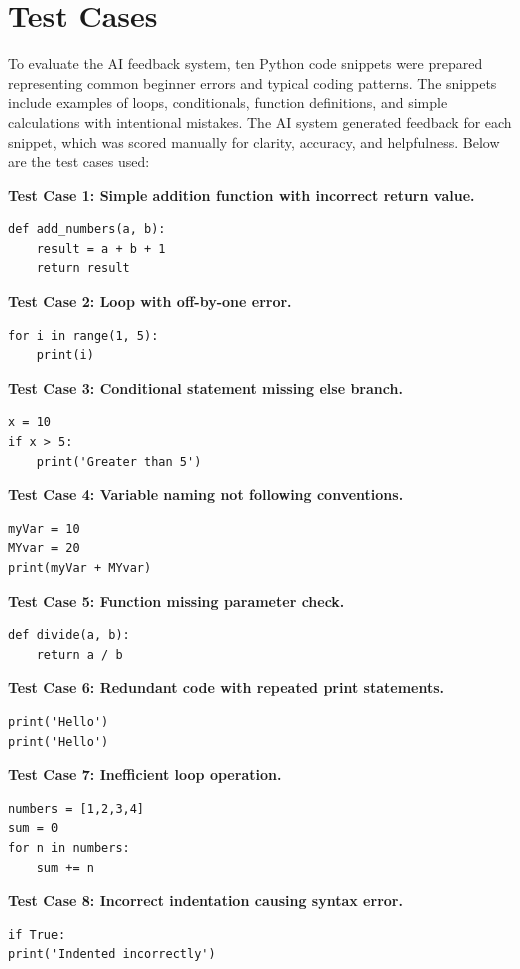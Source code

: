 \documentclass[12pt]{article}
\begin{document}
\section*{Test Cases}

To evaluate the AI feedback system, ten Python code snippets were prepared representing common beginner errors and typical coding patterns. The snippets include examples of loops, conditionals, function definitions, and simple calculations with intentional mistakes. The AI system generated feedback for each snippet, which was scored manually for clarity, accuracy, and helpfulness. Below are the test cases used:

\textbf{Test Case 1: Simple addition function with incorrect return value.}
\begin{lstlisting}
def add_numbers(a, b):
    result = a + b + 1
    return result
\end{lstlisting}

\textbf{Test Case 2: Loop with off-by-one error.}
\begin{lstlisting}
for i in range(1, 5):
    print(i)
\end{lstlisting}

\textbf{Test Case 3: Conditional statement missing else branch.}
\begin{lstlisting}
x = 10
if x > 5:
    print('Greater than 5')
\end{lstlisting}

\textbf{Test Case 4: Variable naming not following conventions.}
\begin{lstlisting}
myVar = 10
MYvar = 20
print(myVar + MYvar)
\end{lstlisting}

\textbf{Test Case 5: Function missing parameter check.}
\begin{lstlisting}
def divide(a, b):
    return a / b
\end{lstlisting}

\textbf{Test Case 6: Redundant code with repeated print statements.}
\begin{lstlisting}
print('Hello')
print('Hello')
\end{lstlisting}

\textbf{Test Case 7: Inefficient loop operation.}
\begin{lstlisting}
numbers = [1,2,3,4]
sum = 0
for n in numbers:
    sum += n
\end{lstlisting}

\textbf{Test Case 8: Incorrect indentation causing syntax error.}
\begin{lstlisting}
if True:
print('Indented incorrectly')
\end{lstlisting}
\end{document}
